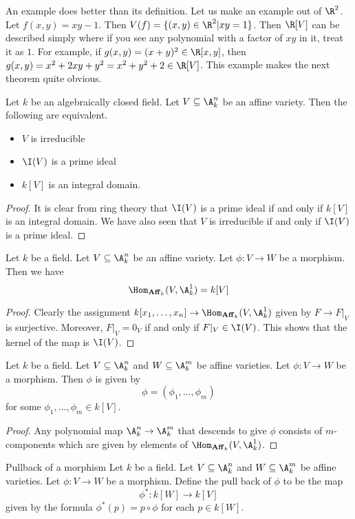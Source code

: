 \documentclass[a4paper]{article}
\begin{document}
An example does better than its definition. Let us make an example out of $\R^2$. Let $f(x,y)=xy-1$. Then $V(f)=\{(x,y)\in\R^2|xy=1\}$. Then $\R[V]$ can be described simply where if you see any polynomial with a factor of $xy$ in it, treat it as $1$. For example, if $g(x,y)=(x+y)^2\in\R[x,y]$, then $g(x,y)=x^2+2xy+y^2=x^2+y^2+2\in\R[V]$. This example makes the next theorem quite obvious. 

\begin{prp}{}{} Let $k$ be an algebraically closed field. Let $V\subseteq\A_k^n$ be an affine variety. Then the following are equivalent. 
\begin{itemize}
\item $V$ is irreducible
\item $\I(V)$ is a prime ideal
\item $k[V]$ is an integral domain. 
\end{itemize}\tcbline
\begin{proof}
It is clear from ring theory that $\I(V)$ is a prime ideal if and only if $k[V]$ is an integral domain. We have also seen that $V$ is irreducible if and only if $\I(V)$ is a prime ideal. 
\end{proof}
\end{prp}

\begin{prp}{}{} Let $k$ be a field. Let $V\subseteq\A_k^n$ be an affine variety. Let $\phi:V\to W$ be a morphism. Then we have $$\Hom_{\bold{Aff}_k}(V,\A_k^1)=k[V]$$ \tcbline
\begin{proof}
Clearly the assignment $k[x_1,\dots,x_n]\to\Hom_{\bold{Aff}_k}(V,\A_k^1)$ given by $F\to F|_V$ is surjective. Moreover, $F|_V=0_V$ if and only if $F|_V\in\I(V)$. This shows that the kernel of the map is $\I(V)$. 
\end{proof}
\end{prp}

\begin{lmm}{}{} Let $k$ be a field. Let $V\subseteq\A_k^n$ and $W\subseteq\A_k^m$ be affine varieties. Let $\phi:V\to W$ be a morphism. Then $\phi$ is given by $$\phi=(\phi_1,\dots,\phi_m)$$ for some $\phi_1,\dots,\phi_m\in k[V]$. \tcbline
\begin{proof}
Any polynomial map $\A_k^n\to\A_k^m$ that descends to give $\phi$ consists of $m$-components which are given by elements of $\Hom_{\bold{Aff}_k}(V,\A_k^1)$. 
\end{proof}
\end{lmm}

\begin{defn}{Pullback of a morphism}{} Let $k$ be a field. Let $V\subseteq\A_k^n$ and $W\subseteq\A_k^m$ be affine varieties. Let $\phi:V\to W$ be a morphism. Define the pull back of $\phi$ to be the map $$\phi^\ast:k[W]\to k[V]$$ given by the formula $\phi^\ast(p)=p\circ\phi$ for each $p\in k[W]$. 
\end{defn}
\end{document}
